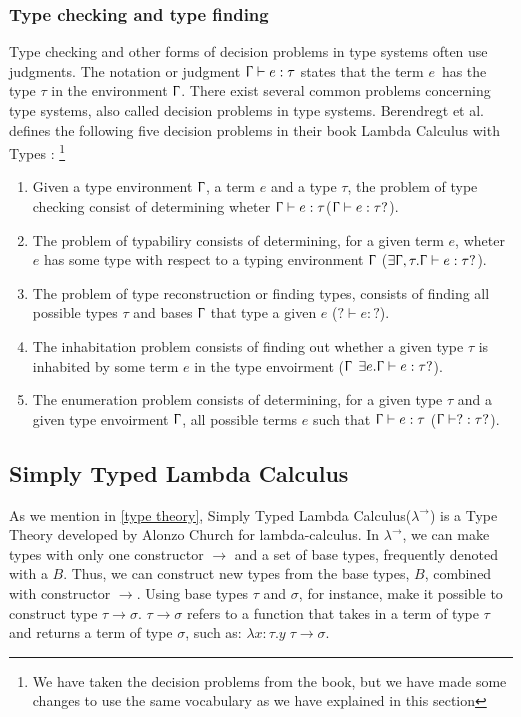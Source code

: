 \subsubsection{Type checking and type finding}
Type checking and other forms of decision problems in type systems often use judgments. The notation or judgment  $\Upgamma \vdash e:\tau$ states that the term $e$ has the type $\tau$ in the environment $\Upgamma$. There exist several common problems concerning type systems, also called decision problems in type systems. Berendregt et al. defines the following five decision problems in their book Lambda Calculus with Types \autocite{nederpelt_geuvers_lc}: \footnote{We have taken the decision problems from the book, but we have made some changes to use the same vocabulary as we have explained in this section
}

\begin{enumerate}
    \item Given a type environment $\Upgamma$, a term $e$ and a type $\tau$, the problem of type checking consist of determining wheter $\Upgamma\vdash e : \tau$($\Upgamma\vdash e : \tau ?$).
    \item The problem of typabiliry consists of determining, for a given term $e$, wheter $e$ has some type with respect to a typing environment $\Upgamma$ ($ \exists \Upgamma,\tau .\Upgamma\vdash e : \tau ?$).
    \item The problem of type reconstruction or finding types, consists of finding all possible types $\tau$ and bases $\Upgamma$ that type a given $e$ ($ ? \vdash e : ?$).
    \item The inhabitation problem consists of finding out whether a given type $\tau$ is inhabited by some term $e$ in the type envoirment ($\Upgamma$ $ \exists e.\Upgamma \vdash e : \tau?$).
    \item The enumeration problem consists of determining, for a given type $\tau$ and a given type envoirment $\Upgamma$, all possible terms $e$ such that $\Upgamma\vdash e : \tau$ ($\Upgamma\vdash ? : \tau ?$).

\end{enumerate}

\subsection{Simply Typed Lambda Calculus}
\label{Simply Typed Lambda Calculus}
As we mention in \autoref{type theory}, Simply Typed Lambda Calculus($\lambda^\rightarrow$) is a Type Theory developed by Alonzo Church for lambda-calculus. In $\lambda^\rightarrow$, we can make types with only one constructor $\rightarrow$ and a set of base types, frequently denoted with a $B$. Thus, we can construct new types from the base types, $B$, combined with constructor $\rightarrow$. Using base types $\tau$ and $\sigma$, for instance, make it possible to construct type $\tau \rightarrow \sigma$. $\tau \rightarrow \sigma$ refers to a function that takes in a term of type $\tau$ and returns a term of type $\sigma$, such as: $\lambda x:\tau. y \; \tau \rightarrow \sigma$. 


